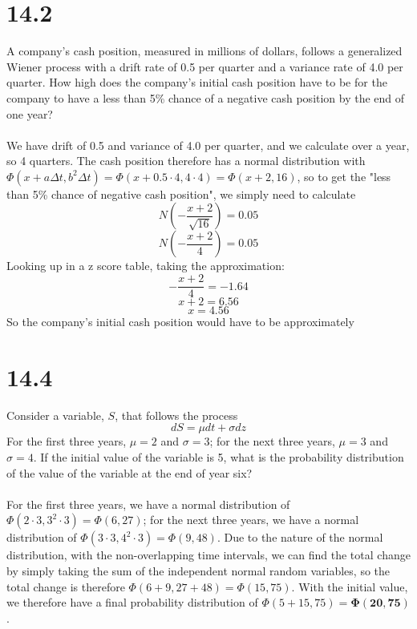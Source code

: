 \documentclass{article}
\begin{document}
\thispagestyle{firstpageheader}
{\Large 

\section*{14.2}
A company's cash position, measured in millions of dollars, follows a generalized Wiener process with a drift rate of 0.5 per quarter and a variance rate of 4.0 per quarter. How high does the company's initial cash position have to be for the company to have a less than 5\% chance of a negative cash position by the end of one year? \\ \\
We have drift of 0.5 and variance of 4.0 per quarter, and we calculate over a year, so 4 quarters. The cash position therefore has a normal distribution with \(\Phi(x + a \Delta t, b^2 \Delta t) = \Phi(x + 0.5 \cdot 4, 4 \cdot 4) = \Phi(x + 2, 16)\), so to get the "less than 5\% chance of negative cash position", we simply need to calculate 
\[
  N(-\frac{x + 2}{\sqrt{16}}) = 0.05
\]
\[
  N(-\frac{x + 2}{4}) = 0.05
\]
Looking up in a z score table, taking the approximation:
\[
  -\frac{x + 2}{4} = -1.64
\]
\[
  x + 2 = 6.56
\]
\[
  x = 4.56
\]
So the company's initial cash position would have to be approximately 


}
{\Large 

\section*{14.4}
Consider a variable, \(S\), that follows the process 
\[
  dS = \mu dt + \sigma dz
\]
For the first three years, \(\mu = 2\) and \(\sigma = 3\); for the next three years, \(\mu = 3\) and \(\sigma = 4\). If the initial value of the variable is 5, what is the probability distribution of the value of the variable at the end of year six? \\ \\
For the first three years, we have a normal distribution of \(\Phi(2 \cdot 3, 3^2 \cdot 3) = \Phi(6, 27)\); for the next three years, we have a normal distribution of \(\Phi(3 \cdot 3, 4^2 \cdot 3) = \Phi(9, 48)\). Due to the nature of the normal distribution, with the non-overlapping time intervals, we can find the total change by simply taking the sum of the independent normal random variables, so the total change is therefore \(\Phi(6 + 9, 27 + 48) = \Phi(15, 75)\). With the initial value, we therefore have a final probability distribution of \(\Phi(5 + 15, 75) = \boxed{\mathbf{\Phi(20, 75)}}\).

}
\end{document}
